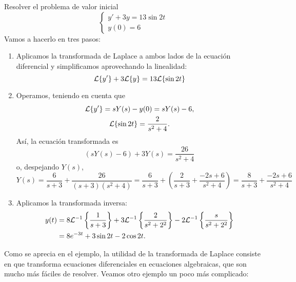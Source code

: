 \documentclass[../main.tex]{subfiles}
\begin{document}
\begin{example}
  Resolver el problema de valor inicial
  \[
    \begin{cases}
      y' + 3y = 13 \sin 2t \\
      y(0) = 6
    \end{cases}
  \]
  Vamos a hacerlo en tres pasos:
  \begin{enumerate}[1)]
  \item Aplicamos la transformada de Laplace a ambos lados de la ecuación
    diferencial y simplificamos aprovechando la linealidad:
    \[\mathcal{L}\{y'\} + 3\mathcal{L}\{y\} = 13\mathcal{L}\{\sin 2t\}\]
  \item Operamos, teniendo en cuenta que
    \begin{gather*}
      \mathcal{L}\{y'\} = sY(s) - y(0) = sY(s) -  6, \\
      \mathcal{L}\{\sin 2t\} = \frac{2}{s^2+4}.
    \end{gather*}
    Así, la ecuación transformada es
    \[(sY(s) - 6) + 3Y(s) = \frac{26}{s^2+4}\]
    o, despejando \(Y(s)\),
    \[
      Y(s) = \frac{6}{s+3} + \frac{26}{(s+3)(s^2+4)} = \frac{6}{s+3} + \left(
        \frac{2}{s+3} + \frac{-2s+6}{s^2+4} \right) = \frac{8}{s+3} + \frac{-2s+6}{s^2+4}
    \]
  \item Aplicamos la transformada inversa:
    \begin{align*}
      y(t) &= 8 \mathcal{L}^{-1}\left\{\frac{1}{s+3}\right\} + 3
      \mathcal{L}^{-1}\left\{\frac{2}{s^2+2^2}\right\} -2
      \mathcal{L}^{-1}\left\{\frac{s}{s^2+2^2}\right\} \\
      &= 8e^{-3t} + 3\sin 2t - 2\cos 2t.
    \end{align*}
  \end{enumerate}
\end{example}

Como se aprecia en el ejemplo, la utilidad de la transformada de Laplace consiste
en que transforma ecuaciones diferenciales en ecuaciones algebraicas, que son
mucho más fáciles de resolver. Veamos otro ejemplo un poco más complicado:
\end{document}
